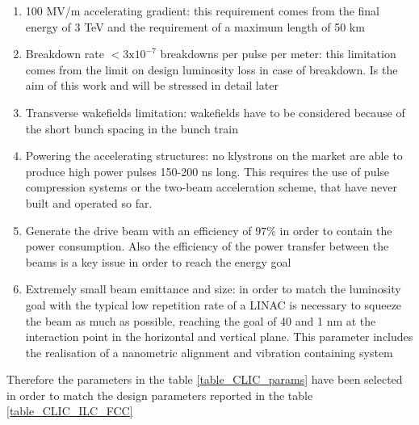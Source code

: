 \begin{enumerate}
\item 100 MV/m accelerating gradient: this requirement comes from the final energy of 3 TeV and the requirement of a maximum length of 50 km
\item Breakdown rate $< 3\text{x}10^{-7}$ breakdowns per pulse per meter: this limitation comes from the limit on design luminosity loss in case of breakdown. Is the aim of this work and will be stressed in detail later
\item Transverse wakefields limitation: wakefields have to be considered because of the short bunch spacing in the bunch train
\item Powering the accelerating structures: no klystrons on the market are able to produce high power pulses 150-200 ns long. This requires the use of pulse compression systems or the two-beam acceleration scheme, that have never built and operated so far. 
\item Generate the drive beam with an efficiency of $97 \%$ in order to contain the power consumption. Also the efficiency of the power transfer between the beams is a key issue in order to reach the energy goal
\item Extremely small beam emittance and size: in order to match the luminosity goal with the typical low repetition rate of a LINAC is necessary to squeeze the beam as much as possible, reaching the goal of 40 and 1 nm at the interaction point in the horizontal and vertical plane. This parameter includes the realisation of a nanometric alignment and vibration containing system 
\end{enumerate}





Therefore the parameters in the table \ref{table_CLIC_params} have been selected in order to match the design parameters reported in the table \ref{table_CLIC_ILC_FCC}



